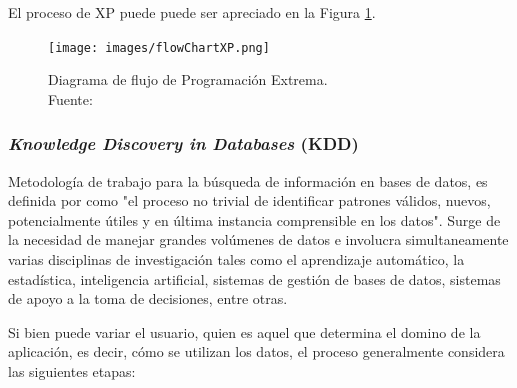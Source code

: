 El proceso de XP puede puede ser apreciado en la Figura \ref{fig:procesoXP}.

\begin{figure}[H]
	\centering
	\captionsetup{justification=centering}
	\texttt{[image: images/flowChartXP.png]}
	\caption[Diagrama de flujo de Programación Extrema.]{Diagrama de flujo de Programación Extrema.\\Fuente: \cite{XP}}
	\label{fig:procesoXP}
\end{figure}

\subsubsection*{\textit{Knowledge Discovery in Databases} (KDD)}
\label{subsubsec:kdd}

Metodología de trabajo para la búsqueda de información en bases de datos, es definida por \cite{KDDFayyad} como "el proceso no trivial de identificar patrones válidos, nuevos, potencialmente útiles y en última instancia comprensible en los datos". Surge de la necesidad de manejar grandes volúmenes de datos e involucra simultaneamente varias disciplinas de investigación tales como el aprendizaje automático, la estadística, inteligencia artificial, sistemas de gestión de bases de datos, sistemas de apoyo a la toma de decisiones, entre otras.

Si bien puede variar el usuario, quien es aquel que determina el domino de la aplicación, es decir, cómo se utilizan los datos, el proceso generalmente considera las siguientes etapas:

